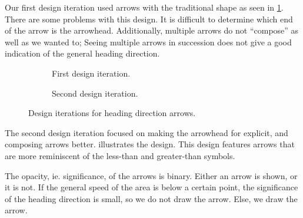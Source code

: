 
Our first design iteration used arrows with the traditional shape as seen in \cref{fig:first_arrow_design}. There are some problems with this design. It is difficult to determine which end of the arrow is the arrowhead. Additionally, multiple arrows do not \enquote{compose} as well as we wanted to; Seeing multiple arrows in succession does not give a good indication of the general heading direction.

\begin{figure}[htbp]
\begin{subfigure}[c]{.49\linewidth}
    \centering
    \caption{First design iteration.}
    \label{fig:first_arrow_design}
\end{subfigure}
%
\begin{subfigure}[c]{.49\linewidth}
    \centering
    \caption{Second design iteration.}
    \label{fig:second_arrow_design}
\end{subfigure}
\caption{Design iterations for heading direction arrows.}
\end{figure}



The second design iteration focused on making the arrowhead for explicit, and composing arrows better.  illustrates the design. This design features arrows that are more reminiscent of the less-than and greater-than symbols.

The opacity, ie. significance, of the arrows is binary. Either an arrow is shown, or it is not. If the general speed of the area is below a certain point, the significance of the heading direction is small, so we do not draw the arrow. Else, we draw the arrow.

